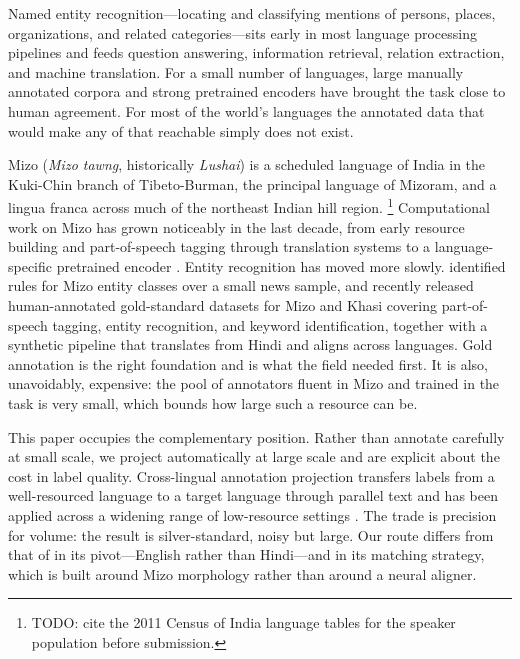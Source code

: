 \documentclass[acmsmall,screen,review]{acmart}
\begin{document}
Named entity recognition---locating and classifying mentions of persons, places,
organizations, and related categories---sits early in most language processing
pipelines and feeds question answering, information retrieval, relation
extraction, and machine translation. For a small number of languages, large
manually annotated corpora and strong pretrained encoders have brought the task
close to human agreement. For most of the world's languages the annotated data
that would make any of that reachable simply does not exist.

Mizo (\textit{Mizo tawng}, historically \textit{Lushai}) is a scheduled language
of India in the Kuki-Chin branch of Tibeto-Burman, the principal language of
Mizoram, and a lingua franca across much of the northeast Indian hill region.%
\footnote{TODO: cite the 2011 Census of India language tables for the speaker
population before submission.}
Computational work on Mizo has grown noticeably in the last decade, from early
resource building and part-of-speech tagging \citep{pakray2015mizopos} through
translation systems \citep{khenglawt2024mizomt} to a language-specific
pretrained encoder \citep{lalramhluna2024mizbert}. Entity recognition has moved
more slowly. \citet{bentham2016mizoner} identified rules for Mizo entity classes
over a small news sample, and \citet{ghosh2025mizokhasi} recently released
human-annotated gold-standard datasets for Mizo and Khasi covering
part-of-speech tagging, entity recognition, and keyword identification, together
with a synthetic pipeline that translates from Hindi and aligns across
languages. Gold annotation is the right foundation and is what the field needed
first. It is also, unavoidably, expensive: the pool of annotators fluent in Mizo
and trained in the task is very small, which bounds how large such a resource
can be.

This paper occupies the complementary position. Rather than annotate carefully
at small scale, we project automatically at large scale and are explicit about
the cost in label quality. Cross-lingual annotation projection transfers labels
from a well-resourced language to a target language through parallel text and
has been applied across a widening range of low-resource settings
\citep{hedderich2021,adelani2022masakhaner,mhaske2023naamapadam}. The trade is
precision for volume: the result is silver-standard, noisy but large. Our route
differs from that of \citet{ghosh2025mizokhasi} in its pivot---English rather
than Hindi---and in its matching strategy, which is built around Mizo
morphology rather than around a neural aligner.
\end{document}
